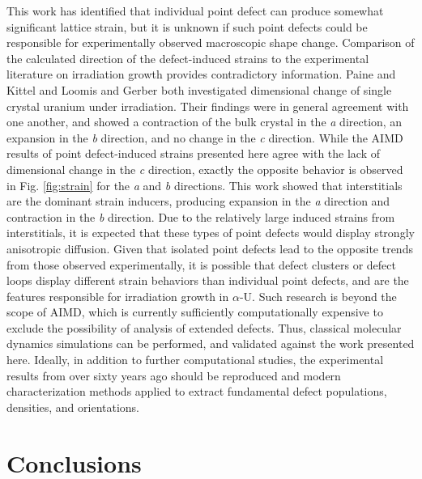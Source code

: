 \documentclass[utf8]{frontiersSCNS} %
\begin{document}
This work has identified that individual point defect can produce somewhat significant lattice strain, but it is unknown if such point defects could be responsible for experimentally observed macroscopic shape change. Comparison of the calculated direction of the defect-induced strains to the experimental literature on irradiation growth provides contradictory information. Paine and Kittel \cite{paine1958} and Loomis and Gerber \cite{loomis1968} both investigated dimensional change of single crystal uranium under irradiation. Their findings were in general agreement with one another, and showed a contraction of the bulk crystal in the \textit{a} direction, an expansion in the \textit{b} direction, and no change in the \textit{c} direction. While the AIMD results of point defect-induced strains presented here agree with the lack of dimensional change in the \textit{c} direction, exactly the opposite behavior is observed in Fig. \ref{fig:strain} for the \textit{a} and \textit{b} directions. This work showed that interstitials are the dominant strain inducers, producing expansion in the \textit{a} direction and contraction in the \textit{b} direction. Due to the relatively large induced strains from interstitials, it is expected that these types of point defects would display strongly anisotropic diffusion. Given that isolated point defects lead to the opposite trends from those observed experimentally, it is possible that defect clusters or defect loops display different strain behaviors than individual point defects, and are the features responsible for irradiation growth in $\alpha$-U. Such research is beyond the scope of AIMD, which is currently sufficiently computationally expensive to exclude the possibility of analysis of extended defects. Thus, classical molecular dynamics simulations can be performed, and validated against the work presented here. Ideally, in addition to further computational studies, the experimental results from over sixty years ago should be reproduced and modern characterization methods applied to extract fundamental defect populations, densities, and orientations. 

\section{Conclusions}
\end{document}
